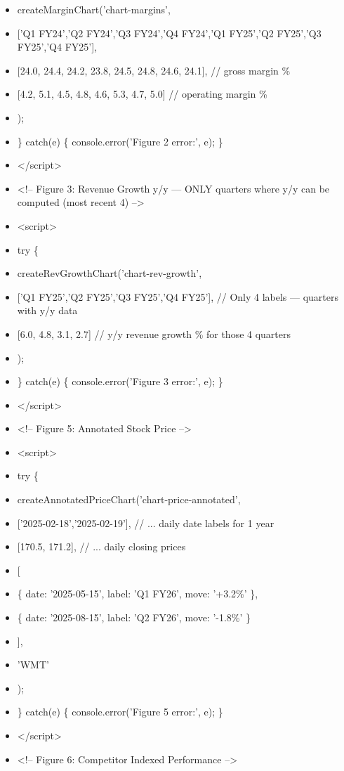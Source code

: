 \documentclass[11pt]{article}
\begin{document}
\begin{itemize}[leftmargin=*,itemsep=2pt,topsep=2pt]
\item {} createMarginChart('chart-margins',
\item {} ['Q1 FY24','Q2 FY24','Q3 FY24','Q4 FY24','Q1 FY25','Q2 FY25','Q3 FY25','Q4 FY25'],
\item {} [24.0, 24.4, 24.2, 23.8, 24.5, 24.8, 24.6, 24.1], // gross margin \%
\item {} [4.2, 5.1, 4.5, 4.8, 4.6, 5.3, 4.7, 5.0] // operating margin \%
\item {} );
\item {} \} catch(e) \{ console.error('Figure 2 error:', e); \}
\item {} </script>
\item {} <!-- Figure 3: Revenue Growth y/y — ONLY quarters where y/y can be computed (most recent 4) -->
\item {} <script>
\item {} try \{
\item {} createRevGrowthChart('chart-rev-growth',
\item {} ['Q1 FY25','Q2 FY25','Q3 FY25','Q4 FY25'], // Only 4 labels — quarters with y/y data
\item {} [6.0, 4.8, 3.1, 2.7] // y/y revenue growth \% for those 4 quarters
\item {} );
\item {} \} catch(e) \{ console.error('Figure 3 error:', e); \}
\item {} </script>
\item {} <!-- Figure 5: Annotated Stock Price -->
\item {} <script>
\item {} try \{
\item {} createAnnotatedPriceChart('chart-price-annotated',
\item {} ['2025-02-18','2025-02-19'], // ... daily date labels for 1 year
\item {} [170.5, 171.2], // ... daily closing prices
\item {} [
\item {} \{ date: '2025-05-15', label: 'Q1 FY26', move: '+3.2\%' \},
\item {} \{ date: '2025-08-15', label: 'Q2 FY26', move: '-1.8\%' \}
\item {} ],
\item {} 'WMT'
\item {} );
\item {} \} catch(e) \{ console.error('Figure 5 error:', e); \}
\item {} </script>
\item {} <!-- Figure 6: Competitor Indexed Performance -->

\end{itemize}
\end{document}
